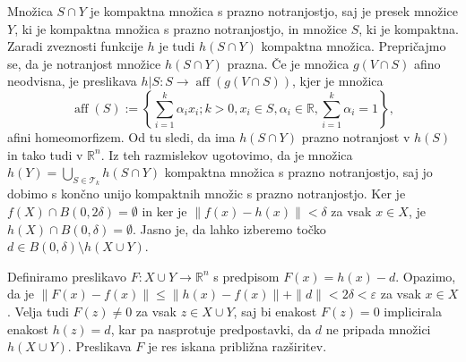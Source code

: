 \documentclass[mat1]{fmfdelo}
\newcommand{\R}{\mathbb R}
\DeclareMathOperator{\aff}{aff}
\newcommand{\0}{0}
\newcommand{\pT}{\mathcal T}
\begin{document}
\begin{dokaz}
Množica $S \cap Y$ je kompaktna množica s prazno notranjostjo, saj je presek množice $Y$, ki je kompaktna množica s prazno notranjostjo, in množice $S$, ki je kompaktna. Zaradi zveznosti funkcije $h$ je tudi $h(S \cap Y)$ kompaktna množica. Prepričajmo se, da je notranjost množice $h(S \cap Y)$ prazna. Če je množica $g(V \cap S)$ afino neodvisna, je preslikava $h|S : S \to \aff(g(V \cap S))$, kjer je množica 
$$\aff(S) := \left\{ \sum_{i=1}^k \alpha_i x_i ; k>0, x_i \in S, \alpha_i \in \R, \sum_{i=1}^k \alpha_i= 1 \right\},$$
afini homeomorfizem. Od tu sledi, da ima $h(S \cap Y)$ prazno notranjost v $h(S)$ in tako tudi v $\R^n$. Iz teh razmislekov ugotovimo, da je množica $h(Y) = \bigcup\limits_{S \in \pT_k} h(S \cap Y)$ kompaktna množica s prazno notranjostjo, saj jo dobimo s končno unijo kompaktnih množic s prazno notranjostjo. Ker je $f(X) \cap B(\0, 2 \delta) = \emptyset$ in ker je $\| f(x) - h(x) \| < \delta$ za vsak $x \in X$, je $h(X) \cap B(\0, \delta) = \emptyset$. Jasno je, da lahko izberemo točko $d \in B(\0, \delta) \setminus h(X \cup Y)$.

Definiramo preslikavo $F : X \cup Y \to \R^n$ s predpisom $F(x)  = h(x) - d$. Opazimo, da je $\| F(x) - f(x) \| \leq \| h(x) - f(x) \| + \| d \| < 2\delta < \varepsilon$ za vsak $x \in X$. Velja tudi $F(z) \neq \0$ za vsak $z \in X \cup Y$, saj bi enakost $F(z) = \0$ implicirala enakost $h(z) = d$, kar pa nasprotuje predpostavki, da $d$ ne pripada množici $h(X \cup Y)$. Preslikava $F$ je res iskana približna razširitev.
\end{dokaz}

\end{document}
